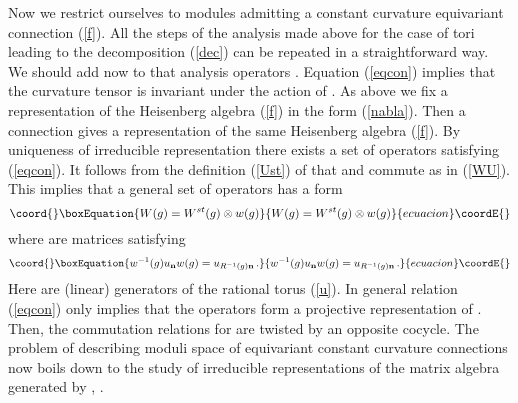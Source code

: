 \documentclass[a4paper,a4paper]{article}
\begin{document}
{ 
Now we restrict ourselves to modules admitting a constant curvature equivariant connection (\ref{f}). 
 All the steps of the analysis made above for the case of tori leading to the decomposition (\ref{dec}) can 
be repeated in a straightforward way. We should add now to 
that analysis operators \coordHE{}. 
 Equation (\ref{eqcon}) implies that the curvature tensor \coordHE{} is invariant under the action of \coordHE{}. 
As above we fix a representation of the Heisenberg algebra (\ref{f}) in the form (\ref{nabla}).
Then a connection \coordHE{} gives a representation of the same Heisenberg 
algebra (\ref{f}). By uniqueness of irreducible representation \coordHE{}  there exists a set of operators 
\coordHE{} satisfying (\ref{eqcon}).   
It follows from the definition  (\ref{Ust}) of \coordHE{}  that \coordHE{} and \coordHE{} 
commute as  in (\ref{WU}). This implies that a general set of operators \coordHE{} has a form 
\begin{equation}\coord{}\boxEquation{
W(g) = W^{st}(g)\otimes w(g) 
}{
W(g) = W^{st}(g)\otimes w(g) 
}{ecuacion}\coordE{}\end{equation}
where \coordHE{} are \coordHE{} matrices satisfying 
\begin{equation}\coord{}\boxEquation{ \label{wu}
w^{-1}(g) u_{\bf n} w (g) =  u_{R^{-1}(g){\bf n}} \, .  
}{ w^{-1}(g) u_{\bf n} w (g) =  u_{R^{-1}(g){\bf n}} \, .  
}{ecuacion}\coordE{}\end{equation}
Here \coordHE{} are (linear) generators  of the rational torus (\ref{u}). 
 In general  relation (\ref{eqcon}) only implies that  
the operators \coordHE{}  form a projective representation of \coordHE{}. Then,  the commutation relations 
for \coordHE{} are twisted by an opposite cocycle. 
The problem of describing moduli space of equivariant constant curvature connections 
now boils down to the study of irreducible representations of the matrix algebra generated by \coordHE{}, \coordHE{}. 


}
\end{document}
